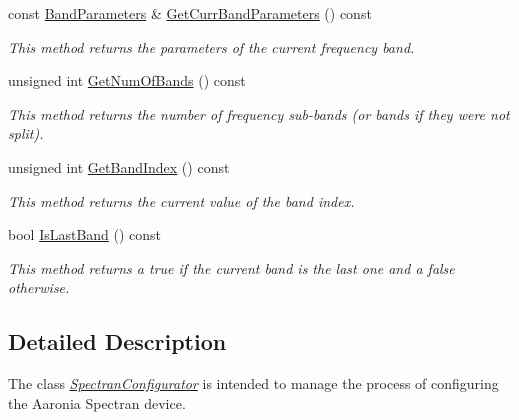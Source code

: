 \begin{DoxyCompactItemize}
\mbox{\label{classSpectranConfigurator_ad9d3fa35d5fbca578a8e503a4eaff97f}} 
const \hyperlink{structBandParameters}{Band\+Parameters} \& \hyperlink{classSpectranConfigurator_ad9d3fa35d5fbca578a8e503a4eaff97f}{Get\+Curr\+Band\+Parameters} () const
\begin{DoxyCompactList}\small\item\em This method returns the parameters of the current frequency band. \end{DoxyCompactList}\item 
\mbox{\label{classSpectranConfigurator_ad76d87b5f229c12dbf378dcf3f9fbf52}} 
unsigned int \hyperlink{classSpectranConfigurator_ad76d87b5f229c12dbf378dcf3f9fbf52}{Get\+Num\+Of\+Bands} () const
\begin{DoxyCompactList}\small\item\em This method returns the number of frequency sub-\/bands (or bands if they were not split). \end{DoxyCompactList}\item 
\mbox{\label{classSpectranConfigurator_a72997f08ddcf4bbcfa4d1bfa632ac002}} 
unsigned int \hyperlink{classSpectranConfigurator_a72997f08ddcf4bbcfa4d1bfa632ac002}{Get\+Band\+Index} () const
\begin{DoxyCompactList}\small\item\em This method returns the current value of the band index. \end{DoxyCompactList}\item 
\mbox{\label{classSpectranConfigurator_afe7186f4e99bf125f2301ce411a8c559}} 
bool \hyperlink{classSpectranConfigurator_afe7186f4e99bf125f2301ce411a8c559}{Is\+Last\+Band} () const
\begin{DoxyCompactList}\small\item\em This method returns a {\ttfamily true} if the current band is the last one and a {\ttfamily false} otherwise. \end{DoxyCompactList}\end{DoxyCompactItemize}


\subsection{Detailed Description}
The class {\itshape \hyperlink{classSpectranConfigurator}{Spectran\+Configurator}} is intended to manage the process of configuring the Aaronia Spectran device. 

